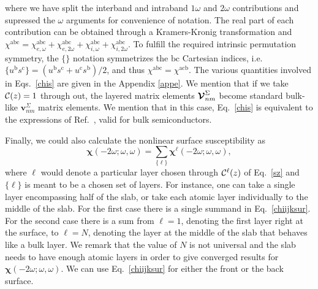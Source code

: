 \documentclass[floatfix,prb,aps,superscriptaddress,showpacs,letterpaper]{revtex4}
\begin{document}
where we have split the interband and intraband $1\omega$ and $2\omega$
contributions and supressed the $\omega$ arguments for 
convenience of notation.
The real part of each contribution can be obtained through
a Kramers-Kronig transformation\cite{nicolasPRB14} and
$\chi^{\mathrm{a}\mathrm{b}\mathrm{c}}=
\chi^{\mathrm{a}\mathrm{b}\mathrm{c}}_{e,\omega} 
+\chi^{\mathrm{a}\mathrm{b}\mathrm{c}}_{e,2\omega}
+\chi^{\mathrm{a}\mathrm{b}\mathrm{c}}_{i,\omega} 
+\chi^{\mathrm{a}\mathrm{b}\mathrm{c}}_{i,2\omega}
$.
To fulfill the required intrinsic permutation symmetry, %
the $\{\}$ notation symmetrizes the $\mathrm{b}\mathrm{c}$ Cartesian indices, i.e. 
$\{u^{\mathrm{b}}s^{\mathrm{c}}\}=(u^{\mathrm{b}}s^{\mathrm{c}}+u^{\mathrm{c}}s^{\mathrm{b}})/2$,
and thus
$\chi^{\mathrm{a}\mathrm{b}\mathrm{c}}=\chi^{\mathrm{a}\mathrm{c}\mathrm{b}}$.
The various quantities involved in Eqs.~\eqref{chis} are given in
the Appendix \ref{appe}. 
We mention that if we take ${\mathbf{\cal C}}(z)=1$ through out, the layered
matrix elements $\boldsymbol{\mathcal{\cal V}}^{\Sigma}_{nm}$ become standard bulk-like
$\mathbf{v}^{\Sigma}_{nm}$ matrix elements. We mention that in this
case, Eq.~\eqref{chis} is equivalent to the expressions of
Ref.~, valid for bulk semiconductors.
 
Finally, we could also calculate the nonlinear surface susceptibility as 
\begin{equation}
\boldsymbol{\chi}(-2\omega;\omega,\omega)
= \sum_{\{\ell\}}\boldsymbol{\chi}^\ell(-2\omega;\omega,\omega),
\label{chiijksur}
\end{equation} 
where $\ell$ would denote a particular layer chosen through
${\mathbf{\cal C}}^\ell(z)$ of Eq.~\eqref{sz} and
$\{\ell\}$
is meant to be a chosen set of layers. For instance, 
one can take a single layer 
encompassing half of the slab, or take each 
atomic layer individually to the middle
of the slab. For the first case there is 
a single summand
in Eq.~\eqref{chiijksur}. For the second case
there is a sum from $\ell=1$, denoting the first layer 
right at the surface, to $\ell=N$, denoting the layer at the middle of the slab 
that behaves like a bulk layer.
We remark that the value of 
$N$ is not universal and
the slab needs to have enough atomic layers 
in order to give converged results for 
$\boldsymbol{\chi} (-2\omega;\omega,\omega)$. 
We can use Eq.~\eqref{chiijksur} for 
either the front or the back surface. 
\cite{mejiaRMF04}
\end{document}
